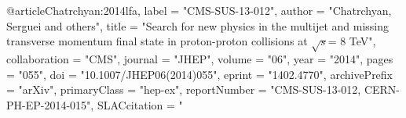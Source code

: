 @article{Chatrchyan:2014lfa,
      label          = "CMS-SUS-13-012",
      author         = "Chatrchyan, Serguei and others",
      title          = "{Search for new physics in the multijet and missing
                        transverse momentum final state in proton-proton
                        collisions at $\sqrt{s}$= 8 TeV}",
      collaboration  = "CMS",
      journal        = "JHEP",
      volume         = "06",
      year           = "2014",
      pages          = "055",
      doi            = "10.1007/JHEP06(2014)055",
      eprint         = "1402.4770",
      archivePrefix  = "arXiv",
      primaryClass   = "hep-ex",
      reportNumber   = "CMS-SUS-13-012, CERN-PH-EP-2014-015",
      SLACcitation   = "%
}

